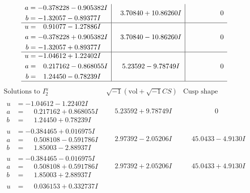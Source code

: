 \documentclass[1p]{elsarticle_modified}
\theoremstyle{definition}
\newcommand{\I}{\sqrt{-1}}
\begin{document}
$$\begin{array}{c|c|c}
\begin{aligned}
a &= -0.378228 - 0.905382 I \\
b &= -1.32057 - 0.89377 I\end{aligned}
 & \phantom{-}3.70840 + 10.86260 I & \phantom{-0.000000 } 0 \\ \hline\begin{aligned}
u &= \phantom{-}0.91077 - 1.27886 I \\
a &= -0.378228 + 0.905382 I \\
b &= -1.32057 + 0.89377 I\end{aligned}
 & \phantom{-}3.70840 - 10.86260 I & \phantom{-0.000000 } 0 \\ \hline\begin{aligned}
u &= -1.04612 + 1.22402 I \\
a &= \phantom{-}0.217162 - 0.868055 I \\
b &= \phantom{-}1.24450 - 0.78239 I\end{aligned}
 & \phantom{-}5.23592 - 9.78749 I & \phantom{-0.000000 } 0\\
 \hline 
 \end{array}$$\newpage$$\begin{array}{c|c|c}  
\text{Solutions to }I^u_{2}& \I (\text{vol} + \sqrt{-1}CS) & \text{Cusp shape}\\
 \hline 
\begin{aligned}
u &= -1.04612 - 1.22402 I \\
a &= \phantom{-}0.217162 + 0.868055 I \\
b &= \phantom{-}1.24450 + 0.78239 I\end{aligned}
 & \phantom{-}5.23592 + 9.78749 I & \phantom{-0.000000 } 0 \\ \hline\begin{aligned}
u &= -0.384465 + 0.016975 I \\
a &= \phantom{-}0.508108 - 0.591786 I \\
b &= \phantom{-}1.85003 - 2.88937 I\end{aligned}
 & \phantom{-}2.97392 - 2.05206 I & \phantom{-}45.0433 - 4.9130 I \\ \hline\begin{aligned}
u &= -0.384465 - 0.016975 I \\
a &= \phantom{-}0.508108 + 0.591786 I \\
b &= \phantom{-}1.85003 + 2.88937 I\end{aligned}
 & \phantom{-}2.97392 + 2.05206 I & \phantom{-}45.0433 + 4.9130 I \\ \hline\begin{aligned}
u &= \phantom{-}0.036153 + 0.332737 I \\

\end{aligned}
\end{array}$$
\end{document}
